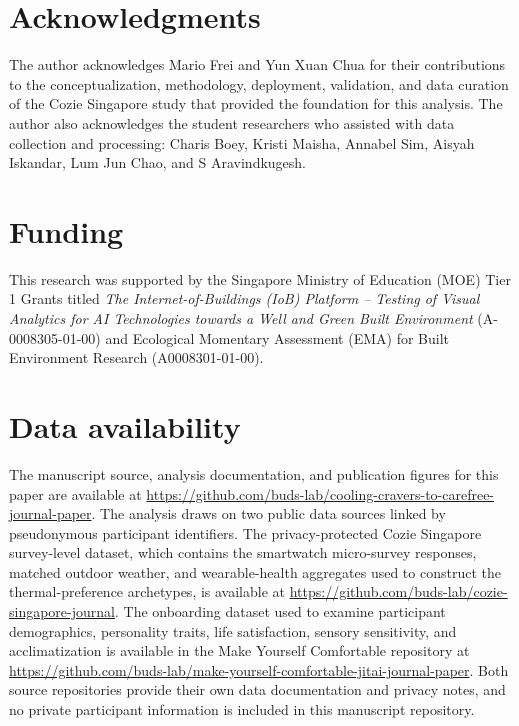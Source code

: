 \documentclass[final,5p,times,twocolumn]{elsarticle}
\begin{document}
\section*{Acknowledgments}
The author acknowledges Mario Frei and Yun Xuan Chua for their contributions to the conceptualization, methodology, deployment, validation, and data curation of the Cozie Singapore study that provided the foundation for this analysis.
The author also acknowledges the student researchers who assisted with data collection and processing: Charis Boey, Kristi Maisha, Annabel Sim, Aisyah Iskandar, Lum Jun Chao, and S Aravindkugesh.

\section*{Funding}
This research was supported by the Singapore Ministry of Education (MOE) Tier 1 Grants titled \textit{The Internet-of-Buildings (IoB) Platform -- Testing of Visual Analytics for AI Technologies towards a Well and Green Built Environment} (A-0008305-01-00) and Ecological Momentary Assessment (EMA) for Built Environment Research (A0008301-01-00).

\section*{Data availability}
The manuscript source, analysis documentation, and publication figures for this paper are available at \url{https://github.com/buds-lab/cooling-cravers-to-carefree-journal-paper}.
The analysis draws on two public data sources linked by pseudonymous participant identifiers.
The privacy-protected Cozie Singapore survey-level dataset, which contains the smartwatch micro-survey responses, matched outdoor weather, and wearable-health aggregates used to construct the thermal-preference archetypes, is available at \url{https://github.com/buds-lab/cozie-singapore-journal}.
The onboarding dataset used to examine participant demographics, personality traits, life satisfaction, sensory sensitivity, and acclimatization is available in the Make Yourself Comfortable repository at \url{https://github.com/buds-lab/make-yourself-comfortable-jitai-journal-paper}.
Both source repositories provide their own data documentation and privacy notes, and no private participant information is included in this manuscript repository.
\end{document}
